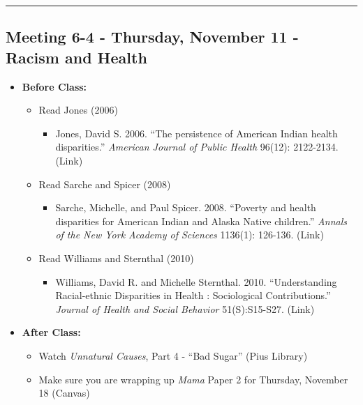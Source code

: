 \documentclass[
]{book}
\providecommand{\tightlist}{%
  \setlength{\itemsep}{0pt}\setlength{\parskip}{0pt}}
\begin{document}
\begin{center}\rule{0.5\linewidth}{0.5pt}\end{center}

\hypertarget{meeting-6-4---thursday-november-11---racism-and-health}{%
\subsection*{Meeting 6-4 - Thursday, November 11 - Racism and Health}\label{meeting-6-4---thursday-november-11---racism-and-health}}

\begin{itemize}
\tightlist
\item
  \textbf{Before Class:}

  \begin{itemize}
  \tightlist
  \item
    Read Jones (2006)

    \begin{itemize}
    \tightlist
    \item
      Jones, David S. 2006. ``The persistence of American Indian health disparities.'' \emph{American Journal of Public Health} 96(12): 2122-2134. (Link)
    \end{itemize}
  \item
    Read Sarche and Spicer (2008)

    \begin{itemize}
    \tightlist
    \item
      Sarche, Michelle, and Paul Spicer. 2008. ``Poverty and health disparities for American Indian and Alaska Native children.'' \emph{Annals of the New York Academy of Sciences} 1136(1): 126-136. (Link)
    \end{itemize}
  \item
    Read Williams and Sternthal (2010)

    \begin{itemize}
    \tightlist
    \item
      Williams, David R. and Michelle Sternthal. 2010. ``Understanding Racial-ethnic Disparities in Health : Sociological Contributions.'' \emph{Journal of Health and Social Behavior} 51(S):S15-S27. (Link)
    \end{itemize}
  \end{itemize}
\item
  \textbf{After Class:}

  \begin{itemize}
  \tightlist
  \item
    Watch \emph{Unnatural Causes}, Part 4 - ``Bad Sugar'' (Pius Library)
  \item
    Make sure you are wrapping up \emph{Mama} Paper 2 for Thursday, November 18 (Canvas)
  \end{itemize}
\end{itemize}
\end{document}
